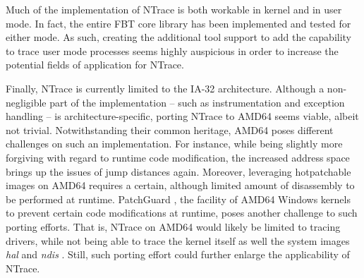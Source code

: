 Much of the implementation of NTrace is both workable in kernel and in user mode. In fact, the 
entire FBT core library has been implemented and tested for either mode. As such, creating the additional
tool support to add the capability to trace user mode processes seems highly auspicious in order
to increase the potential fields of application for NTrace.

Finally, NTrace is currently limited to the IA-32 architecture. Although a non-negligible part of
the implementation -- such as instrumentation and exception handling -- is architecture-specific,
porting NTrace to AMD64 seems viable, albeit not trivial. Notwithstanding their common heritage,
AMD64 poses different challenges on such an implementation. For instance, while 
being slightly more forgiving with regard 
to runtime code modification, the increased address space brings up the issues of jump distances
again. Moreover, leveraging hotpatchable images on AMD64 requires a certain, although limited 
amount of disassembly to be performed at runtime. PatchGuard \cite{Microsoft07}, the facility of AMD64 Windows
kernels to prevent certain code modifications at runtime, poses another challenge to such porting
efforts. That is, NTrace on AMD64 would likely be limited to tracing drivers, while not being 
able to trace the kernel itself as well the system images \emph{hal} and \emph{ndis} \cite{Skywing05}. Still, 
such porting effort could further enlarge the applicability of NTrace.
